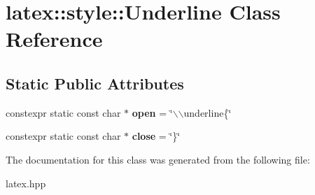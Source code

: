 \hypertarget{classlatex_1_1style_1_1Underline}{\section{latex\-:\-:style\-:\-:\-Underline \-Class \-Reference}
\label{classlatex_1_1style_1_1Underline}
}
\subsection*{\-Static \-Public \-Attributes}
\begin{DoxyCompactItemize}
\item 
\hypertarget{classlatex_1_1style_1_1Underline_a3bcc726be4c113118db71914a5ca03fa}{constexpr static const char $\ast$ {\bfseries open} = \char`\"{}$\backslash$$\backslash$underline\{\char`\"{}}\label{classlatex_1_1style_1_1Underline_a3bcc726be4c113118db71914a5ca03fa}

\item 
\hypertarget{classlatex_1_1style_1_1Underline_a6ce3892d15bca28afb88f7addcde75fe}{constexpr static const char $\ast$ {\bfseries close} = \char`\"{}\}\char`\"{}}\label{classlatex_1_1style_1_1Underline_a6ce3892d15bca28afb88f7addcde75fe}

\end{DoxyCompactItemize}


\-The documentation for this class was generated from the following file\-:\begin{DoxyCompactItemize}
\item 
latex.\-hpp\end{DoxyCompactItemize}

